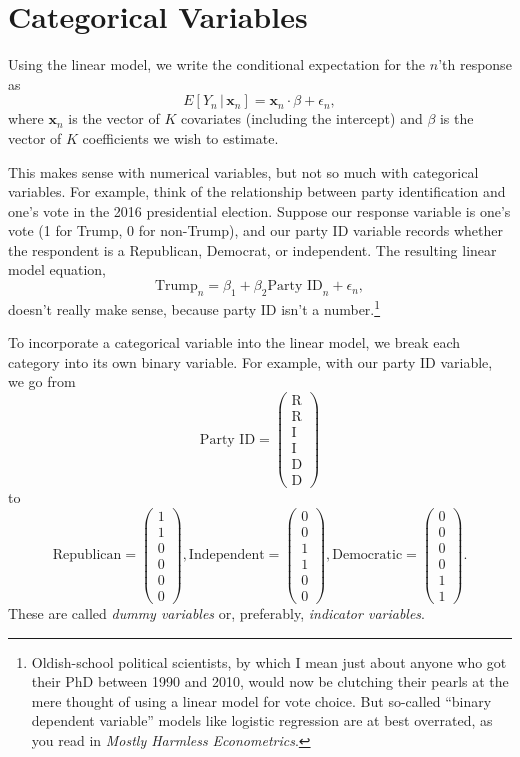 \documentclass[12pt,oneside,openany]{book}
\begin{document}
\section{Categorical Variables}\label{categorical-variables}

Using the linear model, we write the conditional expectation for the
\(n\)'th response as \[
E[Y_n \,|\, \mathbf{x}_n] = \mathbf{x}_n \cdot \beta + \epsilon_n,
\] where \(\mathbf{x}_n\) is the vector of \(K\) covariates (including
the intercept) and \(\beta\) is the vector of \(K\) coefficients we wish
to estimate.

This makes sense with numerical variables, but not so much with
categorical variables. For example, think of the relationship between
party identification and one's vote in the 2016 presidential election.
Suppose our response variable is one's vote (1 for Trump, 0 for
non-Trump), and our party ID variable records whether the respondent is
a Republican, Democrat, or independent. The resulting linear model
equation, \[
\text{Trump}_n = \beta_1 + \beta_2 \text{Party ID}_n + \epsilon_n,
\] doesn't really make sense, because party ID isn't a number.\footnote{Oldish-school
  political scientists, by which I mean just about anyone who got their
  PhD between 1990 and 2010, would now be clutching their pearls at the
  mere thought of using a linear model for vote choice. But so-called
  ``binary dependent variable'' models like logistic regression are at
  best overrated, as you read in \emph{Mostly Harmless Econometrics}.}

To incorporate a categorical variable into the linear model, we break
each category into its own binary variable. For example, with our party
ID variable, we go from \[
\text{Party ID} = \begin{pmatrix}
\text{R} \\
\text{R} \\
\text{I} \\
\text{I} \\
\text{D} \\
\text{D}
\end{pmatrix}
\] to \[
\text{Republican} = \begin{pmatrix} 1 \\ 1 \\ 0 \\ 0 \\ 0 \\ 0 \end{pmatrix},
\text{Independent} = \begin{pmatrix} 0 \\ 0 \\ 1 \\ 1 \\ 0 \\ 0 \end{pmatrix},
\text{Democratic} = \begin{pmatrix} 0 \\ 0 \\ 0 \\ 0 \\ 1 \\ 1 \end{pmatrix}.
\] These are called \emph{dummy variables} or, preferably,
\emph{indicator variables}.
\end{document}
